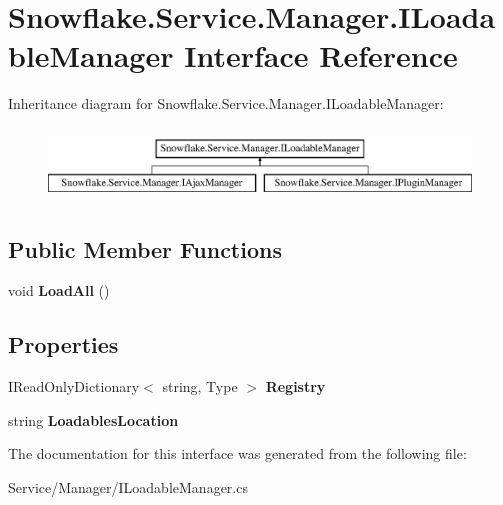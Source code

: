 \hypertarget{interface_snowflake_1_1_service_1_1_manager_1_1_i_loadable_manager}{}\section{Snowflake.\+Service.\+Manager.\+I\+Loadable\+Manager Interface Reference}
\label{interface_snowflake_1_1_service_1_1_manager_1_1_i_loadable_manager}
Inheritance diagram for Snowflake.\+Service.\+Manager.\+I\+Loadable\+Manager\+:\begin{figure}[H]
\begin{center}
\leavevmode
\includegraphics[height=1.924399cm]{interface_snowflake_1_1_service_1_1_manager_1_1_i_loadable_manager}
\end{center}
\end{figure}
\subsection*{Public Member Functions}
\begin{DoxyCompactItemize}
\item 
\hypertarget{interface_snowflake_1_1_service_1_1_manager_1_1_i_loadable_manager_a6b9d4f63d104f22054e0a54c4a98e667}{}void {\bfseries Load\+All} ()\label{interface_snowflake_1_1_service_1_1_manager_1_1_i_loadable_manager_a6b9d4f63d104f22054e0a54c4a98e667}

\end{DoxyCompactItemize}
\subsection*{Properties}
\begin{DoxyCompactItemize}
\item 
\hypertarget{interface_snowflake_1_1_service_1_1_manager_1_1_i_loadable_manager_aa13ef1f4fce3acadd876850e3da3c07c}{}I\+Read\+Only\+Dictionary$<$ string, Type $>$ {\bfseries Registry}\label{interface_snowflake_1_1_service_1_1_manager_1_1_i_loadable_manager_aa13ef1f4fce3acadd876850e3da3c07c}

\item 
\hypertarget{interface_snowflake_1_1_service_1_1_manager_1_1_i_loadable_manager_a10c63816f664d2730455837e1484a081}{}string {\bfseries Loadables\+Location}\label{interface_snowflake_1_1_service_1_1_manager_1_1_i_loadable_manager_a10c63816f664d2730455837e1484a081}

\end{DoxyCompactItemize}


The documentation for this interface was generated from the following file\+:\begin{DoxyCompactItemize}
\item 
Service/\+Manager/I\+Loadable\+Manager.\+cs\end{DoxyCompactItemize}
